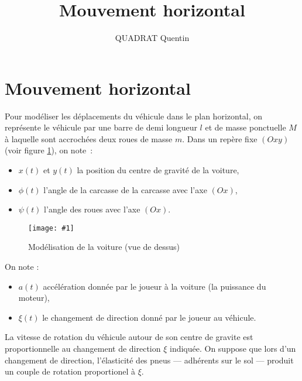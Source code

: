 \documentclass[a4paper,11pt]{amsart}
\title{Mouvement horizontal}
\author{QUADRAT Quentin}
\newcommand{\dessin}[4]{
\begin{figure}[htb]
\centering
\texttt{[image: \#1]}
\caption{#3}
\label{#4}
\end{figure}}
\begin{document}
\maketitle
\section{Mouvement horizontal}

Pour mod\'eliser les d\'eplacements du v\'ehicule dans le plan
horizontal, on repr\'esente le v\'ehicule par une barre de demi
longueur $l$ et de masse ponctuelle $M$ \`a laquelle sont accroch\'ees
deux roues de masse $m$.  Dans un rep\`ere fixe $(Oxy)$ (voir figure
\ref{direction}), on note~:
\begin{itemize}
\item $x(t)$ et $y(t)$ la position du centre de gravit\'e de la voiture,
\item $\phi(t)$ l'angle de la carcasse de la carcasse avec l'axe $(Ox)$,
\item $\psi(t)$ l'angle des roues avec l'axe $(Ox)$.
\end{itemize}

\dessin{direction.epsf}{0.6}{Mod\'elisation de la voiture (vue de dessus)}{direction}

On note :
\begin{itemize}
\item $a(t)$ acc\'el\'eration donn\'ee par le joueur \`a la voiture
(la puissance du moteur),
\item $\xi(t)$ le changement de direction donn\'e par le joueur au v\'ehicule.
\end{itemize}

%
%
%

La vitesse de rotation du v\'ehicule autour de son centre de gravite est proportionnelle au changement de direction $\xi$ indiqu\'ee.
On suppose que lors d'un changement de direction, l'\'elasticit\'e des pneus --- adh\'erents sur le sol --- produit un couple de rotation proportionel \`a $\xi$.
\end{document}
